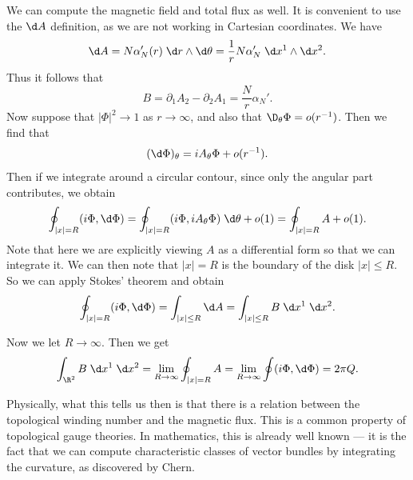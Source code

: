 \documentclass[a4paper]{article}
\begin{document}
We can compute the magnetic field and total flux as well. It is convenient to use the $\d A$ definition, as we are not working in Cartesian coordinates. We have
\[
  \d A = N \alpha_N'(r) \;\d r \wedge \d \theta = \frac{1}{r} N \alpha_N'\;\d x^1 \wedge \d x^2.
\]
Thus it follows that
\[
  B = \partial_1 A_2 - \partial_2 A_1 = \frac{N}{r} \alpha_N'.
\]
Now suppose that $|\Phi|^2 \to 1$ as $r \to \infty$, and also that $\D_\theta \Phi = o(r^{-1})$. Then we find that
\[
  (\d \Phi)_\theta = i A_\theta \Phi + o(r^{-1}).
\]
Then if we integrate around a circular contour, since only the angular part contributes, we obtain
\[
  \oint_{|x| = R} (i \Phi, \d \Phi) = \oint_{|x| = R} (i \Phi, i A_\theta \Phi)\;\d \theta + o(1) = \oint_{|x| = R} A + o(1).
\]
Note that here we are explicitly viewing $A$ as a differential form so that we can integrate it. We can then note that $|x| = R$ is the boundary of the disk $|x| \leq R$. So we can apply Stokes' theorem and obtain
\[
  \oint_{|x| = R} (i \Phi, \d \Phi) = \int_{|x| \leq R} \d A = \int_{|x| \leq R} B\;\d x^1 \;\d x^2.
\]

%
Now we let $R \to \infty$. Then we get
\[
  \int_{\R^2} B\;\d x^1 \;\d x^2 = \lim_{R \to \infty} \oint_{|x| = R} A = \lim_{R \to \infty} \oint (i \Phi, \d \Phi) = 2 \pi Q.
\]

Physically, what this tells us then is that there is a relation between the topological winding number and the magnetic flux. This is a common property of topological gauge theories. In mathematics, this is already well known --- it is the fact that we can compute characteristic classes of vector bundles by integrating the curvature, as discovered by Chern.
\end{document}
